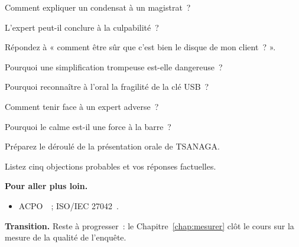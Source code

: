 \begin{boxexo}[title={\ding{45}\quad Exercice~19.2. Expliquer \niveaubase}]
Comment expliquer un condensat à un magistrat~?
\end{boxexo}

\begin{boxexo}[title={\ding{45}\quad Exercice~19.3. Le rôle \niveaubase}]
L'expert peut-il conclure à la culpabilité~?
\end{boxexo}

\begin{boxexo}[title={\ding{45}\quad Exercice~19.4. La question \niveaumoyen}]
Répondez à « comment être sûr que c'est bien le disque de mon client~? ».
\end{boxexo}

\begin{boxexo}[title={\ding{45}\quad Exercice~19.5. Simplifier \niveaumoyen}]
Pourquoi une simplification trompeuse est-elle dangereuse~?
\end{boxexo}

\begin{boxexo}[title={\ding{45}\quad Exercice~19.6. Limites \niveaumoyen}]
Pourquoi reconnaître à l'oral la fragilité de la clé USB~?
\end{boxexo}

\begin{boxexo}[title={\ding{45}\quad Exercice~19.7. Contradiction \niveaumoyen}]
Comment tenir face à un expert adverse~?
\end{boxexo}

\begin{boxexo}[title={\ding{45}\quad Exercice~19.8. Sérénité \niveaumoyen}]
Pourquoi le calme est-il une force à la barre~?
\end{boxexo}

\begin{boxexo}[title={\ding{45}\quad Exercice~19.9. Script \niveauexpert}]
Préparez le déroulé de la présentation orale de TSANAGA.
\end{boxexo}

\begin{boxexo}[title={\ding{45}\quad Exercice~19.10. Objections \niveauexpert}]
Listez cinq objections probables et vos réponses factuelles.
\end{boxexo}

\bigskip

\begin{boxinfo}
\textbf{Pour aller plus loin.}
\begin{itemize}
    \item ACPO~\cite{acpo2012}~; ISO/IEC 27042~\cite{iso27042}.
\end{itemize}
\end{boxinfo}

\begin{boxinfo}
\textbf{Transition.} Reste à progresser~: le Chapitre~\ref{chap:mesurer} clôt
le cours sur la mesure de la qualité de l'enquête.
\end{boxinfo}
